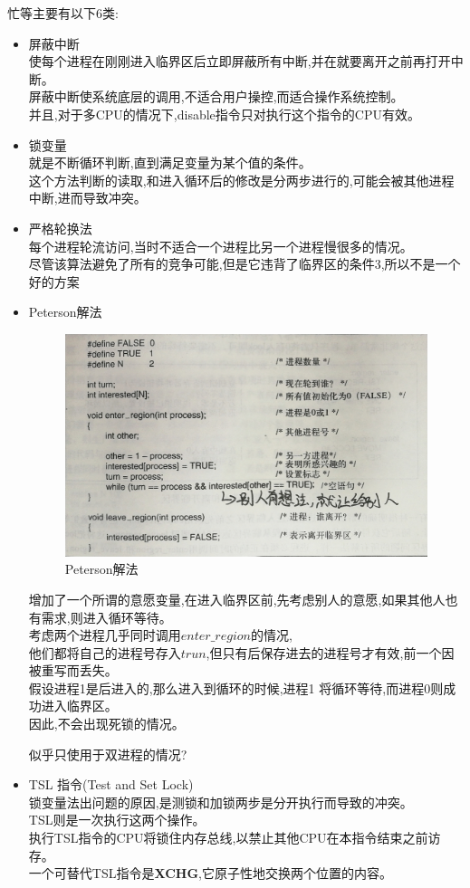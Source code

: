 \documentclass[UTF8,a4paper]{ctexart}
\begin{document}
    忙等主要有以下6类:
    \begin{itemize}
      \item 屏蔽中断\\
      使每个进程在刚刚进入临界区后立即屏蔽所有中断,并在就要离开之前再打开中断。\\
      屏蔽中断使系统底层的调用,不适合用户操控,而适合操作系统控制。\\
      并且,对于多CPU的情况下,disable指令只对执行这个指令的CPU有效。
      \item 锁变量\\
      就是不断循环判断,直到满足变量为某个值的条件。\\
      这个方法判断的读取,和进入循环后的修改是分两步进行的,可能会被其他进程中断,进而导致冲突。
      \item 严格轮换法\\
      每个进程轮流访问,当时不适合一个进程比另一个进程慢很多的情况。\\
      尽管该算法避免了所有的竞争可能,但是它违背了临界区的条件3,所以不是一个好的方案
      \item Peterson解法
      \begin{figure}[H]\centering
        \includegraphics[scale = 0.2]{assets/ModernOperatingSystems_97ad7.png}
        \caption{Peterson解法}
      \end{figure}
      增加了一个所谓的意愿变量,在进入临界区前,先考虑别人的意愿,如果其他人也有需求,则进入循环等待。\\
      考虑两个进程几乎同时调用$enter\_region$的情况,\\
      他们都将自己的进程号存入$trun$,但只有后保存进去的进程号才有效,前一个因被重写而丢失。\\
      假设进程1是后进入的,那么进入到循环的时候,进程1 将循环等待,而进程0则成功进入临界区。\\
      因此,不会出现死锁的情况。

      {\color{blue}似乎只使用于双进程的情况?}
      \item TSL 指令(Test and Set Lock)\\
      锁变量法出问题的原因,是测锁和加锁两步是分开执行而导致的冲突。\\
      TSL则是一次执行这两个操作。\\
      执行TSL指令的CPU将锁住内存总线,以禁止其他CPU在本指令结束之前访存。\\
      一个可替代TSL指令是\textbf{XCHG},它原子性地交换两个位置的内容。
      \end{itemize}
\end{document}
